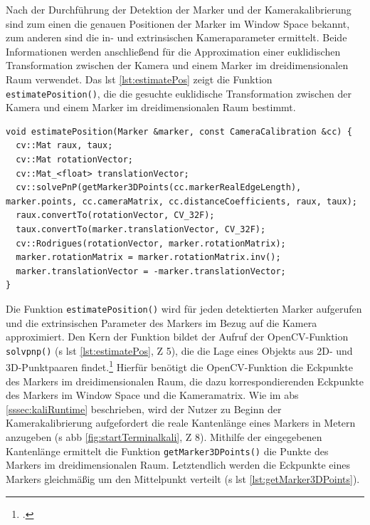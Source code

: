 \noindent Nach der Durchführung der Detektion der Marker und der Kamerakalibrierung sind zum einen die genauen Positionen der Marker im Window Space bekannt, zum anderen sind die in- und extrinsischen Kameraparameter ermittelt. Beide Informationen werden anschließend für die Approximation einer euklidischen Transformation zwischen der Kamera und einem Marker im dreidimensionalen Raum verwendet. Das \acs{lst} \ref{lst:estimatePos} zeigt die Funktion \texttt{estimatePosition()}, die die gesuchte euklidische Transformation zwischen der Kamera und einem Marker im dreidimensionalen Raum bestimmt. 

\begin{lstlisting}[caption={Die Funktion \texttt{detectormarkerbased.cpp/estimatePosition();} bestimmt die Lage eines Markers im dreidimensionalen Raum im Bezug auf die Kamera}, label={lst:estimatePos}]
void estimatePosition(Marker &marker, const CameraCalibration &cc) {
  cv::Mat raux, taux;
  cv::Mat rotationVector;
  cv::Mat_<float> translationVector;
  cv::solvePnP(getMarker3DPoints(cc.markerRealEdgeLength), marker.points, cc.cameraMatrix, cc.distanceCoefficients, raux, taux);
  raux.convertTo(rotationVector, CV_32F);
  taux.convertTo(marker.translationVector, CV_32F);
  cv::Rodrigues(rotationVector, marker.rotationMatrix);
  marker.rotationMatrix = marker.rotationMatrix.inv();
  marker.translationVector = -marker.translationVector;
}
\end{lstlisting}

\noindent Die Funktion \texttt{estimatePosition()} wird für jeden detektierten Marker aufgerufen und die extrinsischen Parameter des Markers im Bezug auf die Kamera approximiert. Den Kern der Funktion bildet der Aufruf der OpenCV-Funktion \texttt{solvpnp()} (\acs{s} \acs{lst} \ref{lst:estimatePos}, \acs{Z} 5), die die Lage eines Objekts aus 2D- und 3D-Punktpaaren findet.\footcite{opencvsolvePnP} Hierfür benötigt die OpenCV-Funktion die Eckpunkte des Markers im dreidimensionalen Raum, die dazu korrespondierenden Eckpunkte des Markers im Window Space und die Kameramatrix. Wie im \acs{abs} \ref{sssec:kaliRuntime} beschrieben, wird der Nutzer zu Beginn der Kamerakalibrierung aufgefordert die reale Kantenlänge eines Markers in Metern anzugeben (\acs{s} \acs{abb} \ref{fig:startTerminalkali}, \acs{Z} 8). Mithilfe der eingegebenen Kantenlänge ermittelt die Funktion \texttt{getMarker3DPoints()} die Punkte des Markers im dreidimensionalen Raum. Letztendlich werden die Eckpunkte eines Markers gleichmäßig um den Mittelpunkt verteilt (\acs{s} \acs{lst} \ref{lst:getMarker3DPoints}).

